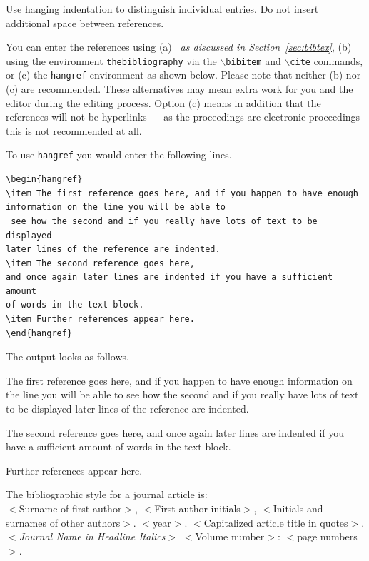 \documentclass{wscpaperproc}
\theoremstyle{wsc}
\begin{document}
Use hanging indentation to distinguish individual entries. Do not insert additional space between references.

You can enter the references using (a) {\em \BibTeX\ as discussed in Section~\ref{sec:bibtex}}, (b) using the environment {\tt thebibliography} via the {\tt $\backslash$bibitem} and {\tt $\backslash$cite} commands, or (c) the {\tt hangref} environment as shown below.
Please note that neither (b) nor (c) are recommended. These alternatives may mean extra work for you and the editor during the editing process. Option (c) means in addition that the references will not be hyperlinks --- as the proceedings are electronic proceedings this is not recommended at all.

To use {\tt hangref} you would enter the following lines.\newline


\begin{verbatim}
\begin{hangref}
\item The first reference goes here, and if you happen to have enough
information on the line you will be able to
 see how the second and if you really have lots of text to be displayed
later lines of the reference are indented.
\item The second reference goes here,
and once again later lines are indented if you have a sufficient amount
of words in the text block.
\item Further references appear here.
\end{hangref}
\end{verbatim}\vspace{4mm}

The output looks as follows.
\begin{hangref}
\item The first reference goes here, and if you happen to have enough information
on the line you will be able to
 see how the second and if you really have lots of text to be displayed later
lines of the reference are indented.
\item The second reference goes here,
and once again later lines are indented if you have a sufficient amount of words in the text block.
\item Further references appear here.
\end{hangref}

The bibliographic style for a journal article is: \\
$<$Surname of first author$>$, $<$First author initials$>$,
$<$Initials and surnames of other authors$>$. $<$year$>$.
$<$Capitalized article title in quotes$>$. $<${\em Journal Name in
Headline Italics}$>$ $<$Volume number$>$: $<$page numbers$>$.
\end{document}
